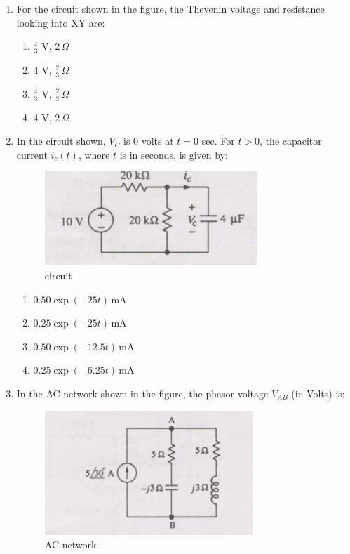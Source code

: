 \documentclass[journal,12pt,onecolumn]{IEEEtran}
\theoremstyle{remark}
\begin{document}
\begin{enumerate}
\item For the circuit shown in the figure, the Thevenin voltage and resistance looking into XY are: 
\hfill{}
\begin{multicols}{4}
\begin{enumerate}
    \item $\frac{4}{3}$ V, $2\,\Omega$
    \item $4$ V, $\frac{2}{3}\,\Omega$
    \item $\frac{4}{3}$ V, $\frac{2}{3}\,\Omega$
    \item $4$ V, $2\,\Omega$
\end{enumerate}
\end{multicols}

\item In the circuit shown, $V_C$ is 0 volts at $t=0$ sec. For $t>0$, the capacitor current $i_c(t)$, where $t$ is in seconds, is given by: 
\hfill{}

\begin{figure}[H]
    \centering
    \includegraphics[width=0.5\linewidth]{Q30.png}
    \caption{circuit}
    \label{fig:full_wave}
\end{figure}

\begin{enumerate}
  \item $0.50\exp(-25t)\,$mA
  \item $0.25\exp(-25t)\,$mA
  \item $0.50\exp(-12.5t)\,$mA
  \item $0.25\exp(-6.25t)\,$mA
\end{enumerate}

\item In the AC network shown in the figure, the phasor voltage $V_{AB}$ (in Volts) is: 

\begin{figure}[H]
    \centering
    \includegraphics[width=0.4\linewidth]{Q31.png}
    \caption{AC network}
    \label{fig:full_wave}
\end{figure}
\hfill{}
\begin{multicols}{4}


\end{multicols}
\end{enumerate}
\end{document}
